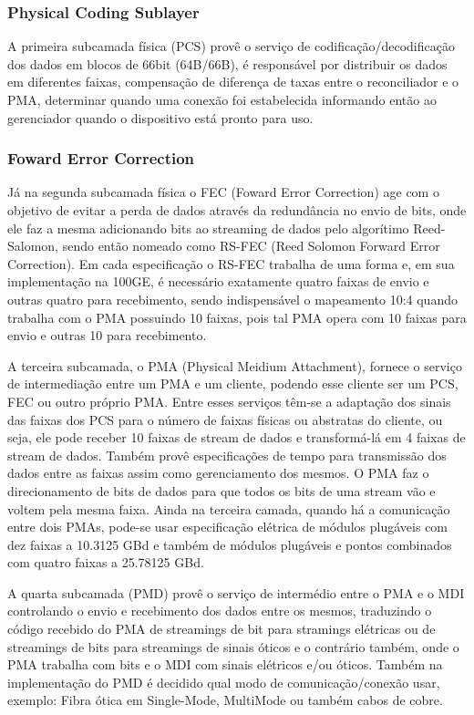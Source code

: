 \documentclass[a4paper,12pt]{article}
\begin{document}
\subsubsection{Physical Coding Sublayer}
A primeira subcamada física (PCS) provê o serviço de codificação/decodificação dos dados em blocos de 66bit (64B/66B), é responsável por distribuir os dados em diferentes faixas, compensação de diferença de taxas entre o reconciliador e o PMA, determinar quando uma conexão foi estabelecida informando então ao gerenciador quando o dispositivo está pronto para uso. 


\subsubsection{Foward Error Correction}
Já na segunda subcamada física o FEC (Foward Error Correction) age com o objetivo de evitar a perda de dados através da redundância no envio de bits, onde ele faz a mesma adicionando bits ao streaming de dados pelo algorítimo Reed-Salomon, sendo então nomeado como RS-FEC (Reed Solomon Forward Error Correction). Em cada especificação o RS-FEC trabalha de uma forma e, em sua implementação na 100GE, é necessário exatamente quatro faixas de envio e outras quatro para recebimento, sendo indispensável o mapeamento 10:4 quando trabalha com o PMA possuindo 10 faixas, pois tal PMA opera com 10 faixas para envio e outras 10 para recebimento.


A terceira subcamada, o PMA (Physical Meidium Attachment), fornece o serviço de intermediação entre um PMA e um cliente, podendo esse cliente ser um PCS, FEC ou outro próprio PMA. Entre esses serviços têm-se a adaptação dos sinais das faixas dos PCS para o número de faixas físicas ou abstratas do cliente, ou seja, ele pode receber 10 faixas de stream de dados e transformá-lá em 4 faixas de stream de dados. Também provê especificações de tempo para transmissão dos dados entre as faixas assim como gerenciamento dos mesmos. O PMA faz o direcionamento de bits de dados para que todos os bits de uma stream vão e voltem pela mesma faixa. Ainda na terceira camada, quando há a comunicação entre dois PMAs, pode-se usar especificação elétrica de módulos plugáveis com dez faixas a 10.3125 GBd e também de módulos plugáveis e pontos combinados com quatro faixas a 25.78125 GBd.


A quarta subcamada (PMD) provê o serviço de intermédio entre o PMA e o MDI controlando o envio e recebimento dos dados entre os mesmos, traduzindo o código recebido do PMA de streamings de bit para stramings elétricas ou de streamings de bits para streamings de sinais óticos e o contrário também, onde o PMA trabalha com bits e o MDI com sinais elétricos e/ou óticos. Também na implementação do PMD é decidido qual modo de comunicação/conexão usar, exemplo: Fibra ótica em Single-Mode, MultiMode ou também cabos de cobre.
\end{document}
